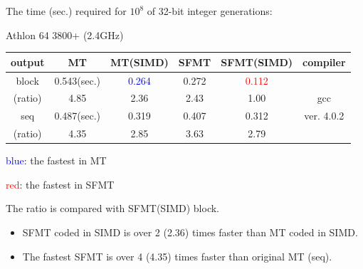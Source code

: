\documentclass[a4j,12pt,landscape]{jarticle}
\begin{document}
\newpage
\begin{center}
The time (sec.) required for $10^8$ 
of 32-bit integer generations:

Athlon 64 3800+ (2.4GHz)

\vskip 2mm
\begin{tabular}{|c||c|c|c|c|c|}
\hline
output & MT & MT{\Large(SIMD)} & SFMT & SFMT{\Large (SIMD)} & compiler
\\ \hline \hline
block & 0.543(sec.) & \textcolor{blue}{0.264}
 & 0.272 & \textcolor{red}{0.112} & \phantom{intel C/C++}\\
 \cline{2-5}
(ratio)& 4.85\phantom{0} & 2.36\phantom{0}  & 2.43\phantom{0} & 1.00\phantom{0} & gcc \\ \cline{1-5}
seq & 0.487(sec.) & 0.319 & 0.407 & 0.312 & ver. 4.0.2\\ \cline{2-5}
(ratio)& 4.35\phantom{0} & 2.85\phantom{0}  & 3.63\phantom{0} & 2.79\phantom{0} & \\ \hline
\end{tabular}
\end{center}
\textcolor{blue}{blue}: the fastest in MT

\textcolor{red}{red}: the fastest in SFMT

The ratio is compared with SFMT(SIMD) block.
\begin{itemize}
  \item SFMT coded in SIMD is over 2 (2.36) times faster than MT
 coded in SIMD.
  \item The fastest SFMT is over 4 (4.35) times faster than original MT (seq).
\end{itemize}
\end{document}
